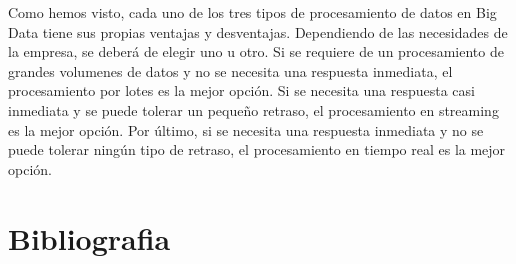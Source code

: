 \documentclass[12pt]{article}
\begin{document}
Como hemos visto, cada uno de los tres tipos de procesamiento de datos en Big Data tiene sus propias ventajas y desventajas.
Dependiendo de las necesidades de la empresa, se deberá de elegir uno u otro. Si se requiere de un procesamiento de grandes volumenes
de datos y no se necesita una respuesta inmediata, el procesamiento por lotes es la mejor opción. Si se necesita una respuesta casi inmediata
y se puede tolerar un pequeño retraso, el procesamiento en streaming es la mejor opción. Por último, si se necesita una respuesta inmediata
y no se puede tolerar ningún tipo de retraso, el procesamiento en tiempo real es la mejor opción.

\clearpage

\section{Bibliografia}

\cite{aws_batch_processing}
\cite{aws_real_time_streaming}
\cite{aws_streaming_data}
\cite{appmaster_real_time_processing}
\cite{confluent_data_streaming}
\cite{aprenderbigdata_stream_processing}
\cite{foqum_real_time_processing}
\cite{powerdata_real_time_advantages}
\cite{profesionalreview_batch}
\cite{wikipedia_lotes}

\printbibliography
\end{document}
